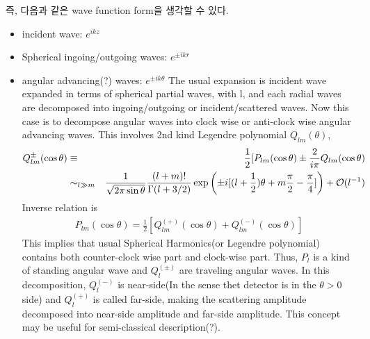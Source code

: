 \documentclass[10pt]{book}
\newcommand{\bea}{\begin{eqnarray}}
\newcommand{\eea}{\end{eqnarray}}
\newcommand{\no}{\nonumber \\}
\begin{document}
즉, 다음과 같은 wave function form을 생각할 수 있다.
\begin{itemize}
\item incident wave: $e^{ikz}$
\item Spherical ingoing/outgoing waves: $e^{\pm i kr}$
\item angular advancing(?) waves: $e^{\pm ik\theta}$
      The usual expansion is incident wave expanded in terms of spherical partial waves, with l,
      and each radial waves are decomposed into ingoing/outgoing or incident/scattered waves. 
      Now this case is to decompose angular waves into clock wise or anti-clock wise angular 
      advancing waves. This involves 2nd kind Legendre polynomial $Q_{lm}(\theta)$,
      \bea 
      Q^{\pm}_{lm}(\cos\theta)&\equiv&\frac{1}{2}[P_{lm}(\cos\theta)\pm \frac{2}{i\pi}Q_{lm}(\cos\theta) \no 
      &\sim_{l\gg m}& \frac{1}{\sqrt{2\pi\sin\theta}}\frac{(l+m)!}{\Gamma(l+3/2)}
      \exp\left( \pm i [ (l+\frac{1}{2})\theta+m\frac{\pi}{2}-\frac{\pi}{4}]\right)
      +{\cal O}(l^{-1})
      \eea 
      Inverse relation is
      \bea 
      P_{lm}(\cos\theta)=\frac{1}{2}[Q^{(+)}_{lm}(\cos\theta)+Q^{(-)}_{lm}(\cos\theta)]
      \eea 
      This implies that usual Spherical Harmonics(or Legendre polynomial)
      contains both counter-clock wise part and clock-wise part. 
      Thus, $P_l$ is a kind of standing angular wave and $Q^{(\pm)}_l$ are
      traveling angular waves. 
      In this decomposition, $Q^{(-)}_l$ is near-side(In the sense thet detector is in the $\theta >0$ side) and $Q^{(+)}_l$ is called far-side, making the scattering amplitude decomposed
      into near-side amplitude and far-side amplitude. This concept may be useful for  semi-classical description(?). 
      
\end{itemize}
\end{document}
